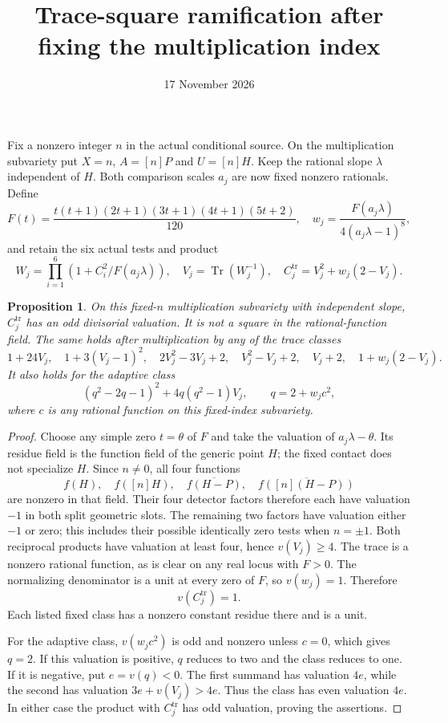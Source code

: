 \documentclass[11pt,a4paper]{article}
\title{Trace-square ramification after fixing the multiplication index}
\author{}\date{17 November 2026}
\newtheorem{proposition}{Proposition}
\begin{document}
\maketitle
Fix a nonzero integer $n$ in the actual conditional source. On the
multiplication subvariety put $X=n$, $A=[n]P$ and $U=[n]H$.
Keep the rational slope $\lambda$ independent of $H$. Both comparison
scales $a_j$ are now fixed nonzero rationals. Define
\[
 F(t)=\frac{t(t+1)(2t+1)(3t+1)(4t+1)(5t+2)}{120},\quad
 w_j=\frac{F(a_j\lambda)}{4(a_j\lambda-1)^8},
\]
and retain the six actual tests and product
\[
 W_j=\prod_{i=1}^6(1+C_i^2/F(a_j\lambda)),\quad
 V_j=\operatorname{Tr}(W_j^{-1}),\quad
 C_j^{\mathrm{tr}}=V_j^2+w_j(2-V_j).
\]

\begin{proposition}
On this fixed-$n$ multiplication subvariety with independent slope,
$C_j^{\mathrm{tr}}$ has an odd divisorial valuation. It is not a square
in the rational-function field. The same holds after multiplication
by any of the trace classes
\[
 1+24V_j,\quad 1+3(V_j-1)^2,\quad 2V_j^2-3V_j+2,
 \quad V_j^2-V_j+2,\quad V_j+2,\quad1+w_j(2-V_j).
\]
It also holds for the adaptive class
\[
 (q^2-2q-1)^2+4q(q^2-1)V_j,\qquad q=2+w_jc^2,
\]
where $c$ is any rational function on this fixed-index subvariety.
\end{proposition}
\begin{proof}
Choose any simple zero $t=\theta$ of $F$ and take the valuation of
$a_j\lambda-\theta$. Its residue field is the function field of the
generic point $H$; the fixed contact does not specialize $H$.
Since $n\ne0$, all four functions
\[
 f(H),\quad f([n]H),\quad
 \overline{f(H-P)},\quad\overline{f([n](H-P))}
\]
are nonzero in that field. Their four detector factors therefore each
have valuation $-1$ in both split geometric slots. The remaining
two factors have valuation either $-1$ or zero; this includes their
possible identically zero tests when $n=\pm1$.
Both reciprocal products have valuation at least four, hence
$v(V_j)\ge4$. The trace is a nonzero rational function, as is clear
on any real locus with $F>0$. The normalizing denominator is a unit
at every zero of $F$, so $v(w_j)=1$. Therefore
\[
 v(C_j^{\mathrm{tr}})=1.
\]
Each listed fixed class has a nonzero constant residue there and is
a unit.

For the adaptive class, $v(w_jc^2)$ is odd and nonzero unless
$c=0$, which gives $q=2$. If this valuation is positive, $q$ reduces
to two and the class reduces to one. If it is negative, put
$e=v(q)<0$. The first summand has valuation $4e$, while the second
has valuation $3e+v(V_j)>4e$. Thus the class has even valuation
$4e$. In either case the product with $C_j^{\mathrm{tr}}$ has odd
valuation, proving the assertions.
\end{proof}
\end{document}
